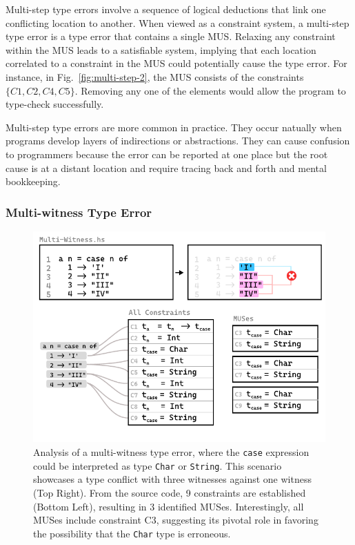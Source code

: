 \documentclass[pdflatex,sn-nature,Numbered]{sn-jnl}%
\begin{document}
Multi-step type errors involve a sequence of logical deductions that link one conflicting location to another. When viewed as a constraint system, a multi-step type error is a type error that contains a single MUS. Relaxing any constraint within the MUS leads to a satisfiable system, implying that each location correlated to a constraint in the MUS could potentially cause the type error. For instance, in Fig.~\ref{fig:multi-step-2}, the MUS consists of the constraints $\{C1, C2, C4, C5\}$. Removing any one of the elements would allow the program to type-check successfully.

Multi-step type errors are more common in practice. They occur natually when programs develop layers of indirections or abstractions. They can cause confusion to programmers because the error can be reported at one place but the root cause is at a distant location and require tracing back and forth and mental bookkeeping. 


\subsubsection*{Multi-witness Type Error} 

\begin{figure}[hbt]
    \centering
\includegraphics[width=\linewidth]{images/Multi-Witness-MUS}
  \caption{\label{fig:multi-witness-2}
    Analysis of a multi-witness type error, where the \texttt{case} expression could be interpreted as type \texttt{Char} or \texttt{String}. This scenario showcases a type conflict with three witnesses against one witness (Top Right). From the source code, 9 constraints are established (Bottom Left), resulting in 3 identified MUSes. Interestingly, all MUSes include constraint C3, suggesting its pivotal role in favoring the possibility that the \texttt{Char} type is erroneous.
  }
  \end{figure}
\end{document}
